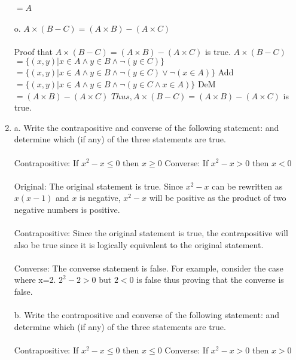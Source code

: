\documentclass[]{article}
\begin{document}
\begin{enumerate}
    \newline $=A $
    \\\\o. $A \times (B-C)=(A \times B)-(A \times C)$
    \\\\Proof that $A \times (B-C)=(A \times B)-(A \times C)$ is true.
    \newline $A \times (B-C)$
    \newline $=\{(x,y)|x \in A \land y\in B \land \neg (y\in C)\}$
    \newline $=\{(x,y)|x \in A \land y\in B \land \neg (y\in C) \lor \neg (x \in A)\}$ Add
    \newline $=\{(x,y)|x \in A \land y\in B \land \neg (y\in C \land x \in A)\}$ DeM
    \newline $=(A \times B)-(A \times C)$ 
    \newline $Thus,A \times (B-C)=(A \times B)-(A \times C)$ is true.
    \item a.  Write the contrapositive and converse of the following statement:  and determine which (if any) of the three statements are true.
    \\\\ Contrapositive: If $x^2-x \leq 0$ then $x \geq 0$
    \newline Converse: If $x^2-x>0$ then $x<0$
    \\\\ Original: The original statement is true. Since $x^2-x$ can be rewritten as $x(x-1)$ and $x$ is negative, $x^2-x$ will be positive as the product of two negative numbers is positive.
    \\\\ Contrapositive: Since the original statement is true, the contrapositive will also be true since it is logically equivalent to the original statement.
    \\\\ Converse: The converse statement is false. For example, consider the case where x=2. $2^2-2>0$ but $2<0$ is false thus proving that the converse is false.
    \\\\b. Write the contrapositive and converse of the following statement:  and determine which (if any) of the three statements are true.
    \\\\ Contrapositive: If $x^2-x \leq 0$ then $x \leq 0$
    \newline Converse: If $x^2-x>0$ then $x>0$

\end{enumerate}
\end{document}
